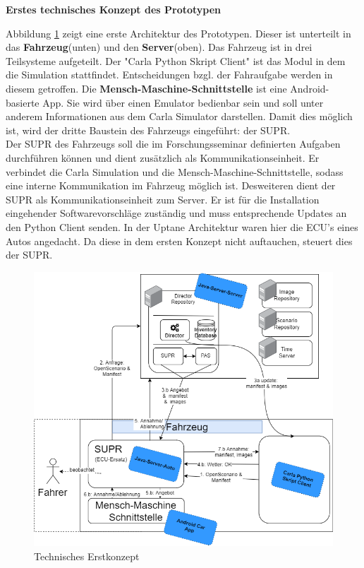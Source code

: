 \begin{large}
	\textbf{Erstes technisches Konzept des Prototypen}\\
\end{large}
Abbildung \ref{konzept} zeigt eine erste Architektur des Prototypen. Dieser ist unterteilt in das \textbf{Fahrzeug}(unten) und den \textbf{Server}(oben). Das Fahrzeug ist in drei Teilsysteme aufgeteilt. Der "Carla Python Skript Client" ist das Modul in dem die Simulation stattfindet. Entscheidungen bzgl. der Fahraufgabe werden in diesem getroffen. Die \textbf{Mensch-Maschine-Schnittstelle} ist eine Android-basierte App. Sie wird über einen Emulator bedienbar sein und soll unter anderem Informationen aus dem Carla Simulator darstellen. Damit dies möglich ist, wird der dritte Baustein des Fahrzeugs eingeführt: der SUPR.\\
Der SUPR des Fahrzeugs soll die im Forschungsseminar definierten Aufgaben durchführen können und dient zusätzlich als Kommunikationseinheit. Er verbindet die Carla Simulation und die Mensch-Maschine-Schnittstelle, sodass eine interne Kommunikation im Fahrzeug möglich ist. Desweiteren dient der SUPR als Kommunikationseinheit zum Server. Er ist für die Installation eingehender Softwarevorschläge zuständig und muss entsprechende Updates an den Python Client senden. In der Uptane Architektur waren hier die ECU's eines Autos angedacht. Da diese in dem ersten Konzept nicht auftauchen, steuert dies der SUPR.
\begin{figure}[H]
	\includegraphics[width = \linewidth]{../pictures/konzept.png}
	\caption{Technisches Erstkonzept}
	\label{konzept}
\end{figure}
